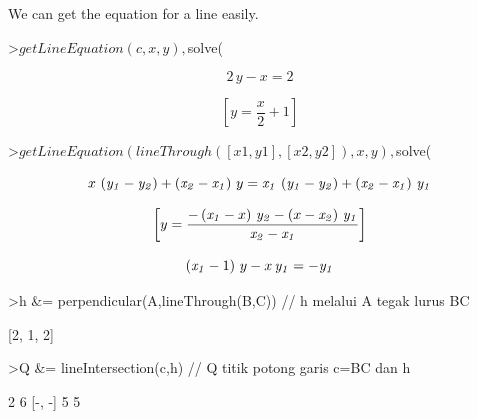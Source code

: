 \documentclass[a4paper,10pt]{article}
\begin{document}
\begin{eulernotebook}
\begin{eulercomment}
\begin{eulercomment}
\begin{euleroutput}
\end{euleroutput}
\begin{eulercomment}
We can get the equation for a line easily.
\end{eulercomment}
\begin{eulerprompt}
>$getLineEquation(c,x,y), $solve(%
\end{eulerprompt}
\begin{eulerformula}
\[
2\,y-x=2
\]
\end{eulerformula}
\begin{eulerformula}
\[
\left[ y=\frac{x}{2}+1 \right] 
\]
\end{eulerformula}
\begin{eulerprompt}
>$getLineEquation(lineThrough([x1,y1],[x2,y2]),x,y), $solve(%
\end{eulerprompt}
\begin{eulerformula}
\[
x\,\left({\it y_1}-{\it y_2}\right)+\left({\it x_2}-{\it x_1}
 \right)\,y={\it x_1}\,\left({\it y_1}-{\it y_2}\right)+\left(
 {\it x_2}-{\it x_1}\right)\,{\it y_1}
\]
\end{eulerformula}
\begin{eulerformula}
\[
\left[ y=\frac{-\left({\it x_1}-x\right)\,{\it y_2}-\left(x-
 {\it x_2}\right)\,{\it y_1}}{{\it x_2}-{\it x_1}} \right] 
\]
\end{eulerformula}
\begin{eulerformula}
\[
\left({\it x_1}-1\right)\,y-x\,{\it y_1}=-{\it y_1}
\]
\end{eulerformula}
\begin{eulerprompt}
>h &= perpendicular(A,lineThrough(B,C)) // h melalui A tegak lurus BC
\end{eulerprompt}
\begin{euleroutput}
  
                                [2, 1, 2]
  
\end{euleroutput}
\begin{eulerprompt}
>Q &= lineIntersection(c,h) // Q titik potong garis c=BC dan h
\end{eulerprompt}
\begin{euleroutput}
  
                                   2  6
                                  [-, -]
                                   5  5
  

\end{euleroutput}
\end{eulercomment}
\end{eulercomment}
\end{eulernotebook}
\end{document}
